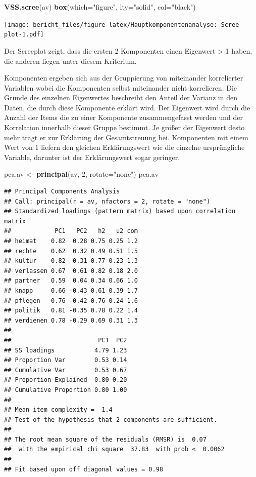 \documentclass[]{article}
\newenvironment{Shaded}{\begin{snugshade}}{\end{snugshade}}
\newcommand{\KeywordTok}[1]{\textcolor[rgb]{0.13,0.29,0.53}{\textbf{{#1}}}}
\newcommand{\DataTypeTok}[1]{\textcolor[rgb]{0.13,0.29,0.53}{{#1}}}
\newcommand{\DecValTok}[1]{\textcolor[rgb]{0.00,0.00,0.81}{{#1}}}
\newcommand{\StringTok}[1]{\textcolor[rgb]{0.31,0.60,0.02}{{#1}}}
\newcommand{\NormalTok}[1]{{#1}}
\begin{document}
\begin{Shaded}
\begin{Highlighting}[]
\KeywordTok{VSS.scree}\NormalTok{(av)}
\KeywordTok{box}\NormalTok{(}\DataTypeTok{which=}\StringTok{"figure"}\NormalTok{, }\DataTypeTok{lty=}\StringTok{"solid"}\NormalTok{, }\DataTypeTok{col=}\StringTok{"black"}\NormalTok{)}
\end{Highlighting}
\end{Shaded}

\texttt{[image: bericht\_files/figure-latex/Hauptkomponentenanalyse: Scree plot-1.pdf]}

Der Screeplot zeigt, dass die ersten 2 Komponenten einen Eigenwert
\textgreater{} 1 haben, die anderen liegen unter diesem Kriterium.

Komponenten ergeben sich aus der Gruppierung von miteinander
korrelierter Variablen wobei die Komponenten selbst miteinander nicht
korrelieren. Die Gründe des einzelnen Eigenwertes beschreibt den Anteil
der Varianz in den Daten, die durch diese Komponente erklärt wird. Der
Eigenwert wird durch die Anzahl der Items die zu einer Komponente
zusammengefasst werden und der Korrelation innerhalb dieser Gruppe
bestimmt. Je größer der Eigenwert desto mehr trägt er zur Erklärung der
Gesamtstreuung bei. Komponenten mit einem Wert von 1 liefern den
gleichen Erklärungswert wie die einzelne ursprüngliche Variable,
darunter ist der Erklärungswert sogar geringer.

\begin{Shaded}
\begin{Highlighting}[]
\NormalTok{pca.av <-}\StringTok{ }\KeywordTok{principal}\NormalTok{(av, }\DecValTok{2}\NormalTok{, }\DataTypeTok{rotate=}\StringTok{"none"}\NormalTok{)}
\NormalTok{pca.av}
\end{Highlighting}
\end{Shaded}

\begin{verbatim}
## Principal Components Analysis
## Call: principal(r = av, nfactors = 2, rotate = "none")
## Standardized loadings (pattern matrix) based upon correlation matrix
##            PC1   PC2   h2   u2 com
## heimat    0.82  0.28 0.75 0.25 1.2
## rechte    0.62  0.32 0.49 0.51 1.5
## kultur    0.82  0.31 0.77 0.23 1.3
## verlassen 0.67  0.61 0.82 0.18 2.0
## partner   0.59  0.04 0.34 0.66 1.0
## knapp     0.66 -0.43 0.61 0.39 1.7
## pflegen   0.76 -0.42 0.76 0.24 1.6
## politik   0.81 -0.35 0.78 0.22 1.4
## verdienen 0.78 -0.29 0.69 0.31 1.3
## 
##                        PC1  PC2
## SS loadings           4.79 1.23
## Proportion Var        0.53 0.14
## Cumulative Var        0.53 0.67
## Proportion Explained  0.80 0.20
## Cumulative Proportion 0.80 1.00
## 
## Mean item complexity =  1.4
## Test of the hypothesis that 2 components are sufficient.
## 
## The root mean square of the residuals (RMSR) is  0.07 
##  with the empirical chi square  37.83  with prob <  0.0062 
## 
## Fit based upon off diagonal values = 0.98
\end{verbatim}
\end{document}
